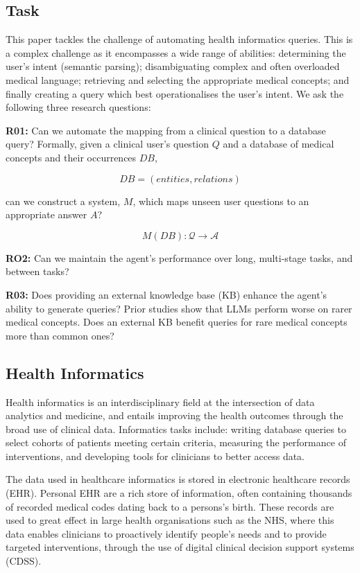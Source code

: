 \documentclass[11pt]{article}
\begin{document}
\subsection{Task}
This paper tackles the challenge of automating health informatics queries. This is a complex challenge as it encompasses a wide range of abilities: determining the user's intent (semantic parsing); disambiguating complex and often overloaded medical language; retrieving and selecting the appropriate medical concepts; and finally creating a query which best operationalises the user's intent. We ask the following three research questions:

\textbf{R01:} Can we automate the mapping from a clinical question to a database query? Formally, given a clinical user's question $Q$ and a database of medical concepts and their occurrences $DB$,

  $$ DB = (entities, relations) $$

can we construct a system, $M$, which maps unseen user questions to an appropriate answer $A$?

  $$ M(DB): \mathcal{Q} \rightarrow \mathcal{A} $$

\textbf{RO2:} Can we maintain the agent's performance over long, multi-stage tasks, and between tasks?

\textbf{R03:} Does providing an external knowledge base (KB) enhance the agent's ability to generate queries? Prior studies show that LLMs perform worse on rarer medical concepts. Does an external KB benefit queries for rare medical concepts more than common ones?


\subsection{Health Informatics}
Health informatics is an interdisciplinary field at the intersection of data analytics and medicine, and entails improving the health outcomes through the broad use of clinical data. Informatics tasks include: writing database queries to select cohorts of patients meeting certain criteria, measuring the performance of interventions, and developing tools for clinicians to better access data. 

The data used in healthcare informatics is stored in electronic healthcare records (EHR). Personal EHR are a rich store of information, often containing thousands of recorded medical codes dating back to a persons's birth. These records are used to great effect in large health organisations such as the NHS, where this data enables clinicians to proactively identify people's needs and to provide targeted interventions, through the use of digital clinical decision support systems (CDSS).
\end{document}
